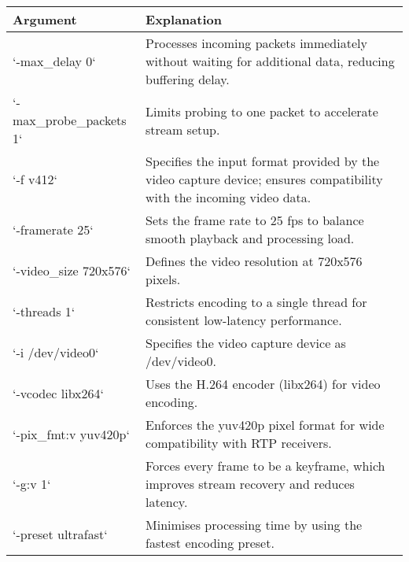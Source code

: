 \begin{table}[!ht]
	\centering
	\begin{tabular}{|p{5cm}|p{10cm}|}
		\hline
		Argument                                        & Explanation                                                                                                          \\ \hline
		`-max\_delay 0`                                 & Processes incoming packets immediately without waiting for additional data, reducing buffering delay.                \\ \hline
		`-max\_probe\_packets 1`                        & Limits probing to one packet to accelerate stream setup.                                                             \\ \hline
		`-f v412`                                       & Specifies the input format provided by the video capture device; ensures compatibility with the incoming video data. \\ \hline
		`-framerate 25`                                 & Sets the frame rate to 25 fps to balance smooth playback and processing load.                                        \\ \hline
		`-video\_size 720x576`                          & Defines the video resolution at 720x576 pixels.                                                                      \\ \hline
		`-threads 1`                                    & Restricts encoding to a single thread for consistent low-latency performance.                                        \\ \hline
		`-i /dev/video0`                                & Specifies the video capture device as /dev/video0.                                                                   \\ \hline
		`-vcodec libx264`                               & Uses the H.264 encoder (libx264) for video encoding.                                                                 \\ \hline
		`-pix\_fmt:v yuv420p`                           & Enforces the yuv420p pixel format for wide compatibility with RTP receivers.                                         \\ \hline
		`-g:v 1`                                        & Forces every frame to be a keyframe, which improves stream recovery and reduces latency.                             \\ \hline
		`-preset ultrafast`                             & Minimises processing time by using the fastest encoding preset.                                                      \\ \hline

\end{tabular}
\end{table}
